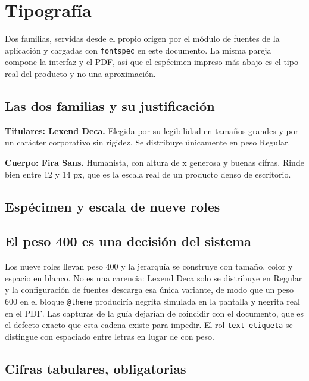 \section{Tipografía}

Dos familias, servidas desde el propio origen por el módulo de fuentes de la aplicación y cargadas con \texttt{fontspec} en este documento. La misma pareja compone la interfaz y el PDF, así que el espécimen impreso más abajo es el tipo real del producto y no una aproximación.

\subsection{Las dos familias y su justificación}

\textbf{Titulares: Lexend Deca.} Elegida por su legibilidad en tamaños grandes y por un carácter corporativo sin rigidez. Se distribuye únicamente en peso Regular.

\textbf{Cuerpo: Fira Sans.} Humanista, con altura de x generosa y buenas cifras. Rinde bien entre 12 y 14 px, que es la escala real de un producto denso de escritorio.

\subsection{Espécimen y escala de nueve roles}

\laminaTipografia

\subsection{El peso 400 es una decisión del sistema}

Los nueve roles llevan peso 400 y la jerarquía se construye con tamaño, color y espacio en blanco. No es una carencia: Lexend Deca solo se distribuye en Regular y la configuración de fuentes descarga esa única variante, de modo que un peso 600 en el bloque \texttt{@theme} produciría negrita simulada en la pantalla y negrita real en el PDF. Las capturas de la guía dejarían de coincidir con el documento, que es el defecto exacto que esta cadena existe para impedir. El rol \texttt{text-etiqueta} se distingue con espaciado entre letras en lugar de con peso.

\subsection{Cifras tabulares, obligatorias}

